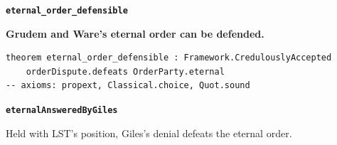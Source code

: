 \documentclass[11pt,paper=\testimonypaper,DIV=13,parskip=false]{scrartcl}
\begin{document}
\par\medskip\noindent\textbf{\texttt{eternal\_\allowbreak{}order\_\allowbreak{}defensible}}\par\nobreak\noindent
\textbf{Grudem and Ware’s eternal order can be defended.}

{\small\begin{verbatim}
theorem eternal_order_defensible : Framework.CredulouslyAccepted
    orderDispute.defeats OrderParty.eternal
-- axioms: propext, Classical.choice, Quot.sound
\end{verbatim}}
\par\medskip\noindent\textbf{\texttt{eternal\allowbreak{}Answered\allowbreak{}By\allowbreak{}Giles}}\par\nobreak\noindent
Held with LST’s position, Giles’s denial defeats the eternal order.
\end{document}

